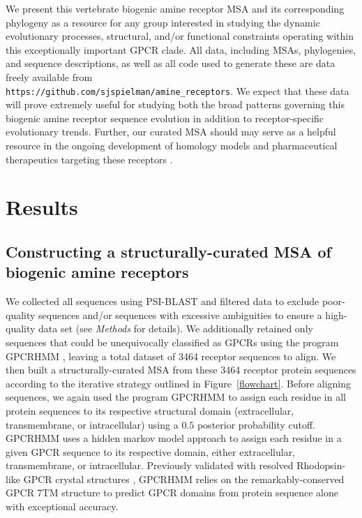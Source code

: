 \documentclass[fleqn,10pt]{wlpeerj}
\begin{document}
We present this vertebrate biogenic amine receptor MSA and its corresponding phylogeny as a resource for any group interested in studying the dynamic evolutionary processes, structural, and/or functional constraints operating within this exceptionally important GPCR clade. All data, including MSAs, phylogenies, and sequence descriptions, as well as all code used to generate these are data freely available from \\\texttt{https://github.com/sjspielman/amine\_receptors}. We expect that these data will prove extremely useful for studying both the broad patterns governing this biogenic amine receptor sequence evolution in addition to receptor-specific evolutionary trends. Further, our curated MSA should may serve as a helpful resource in the ongoing development of homology models and pharmaceutical therapeutics targeting these receptors \citep{Kristiansen2004,Ishiguro2004,Eversetal2005,Masonetal2012}.




\section*{Results}

\subsection*{Constructing a structurally-curated MSA of biogenic amine receptors}

We collected all sequences using PSI-BLAST and filtered data to exclude poor-quality sequences and/or sequences with excessive ambiguities to ensure a high-quality data set (see \emph{Methods} for details). We additionally retained only sequences that could be unequivocally classified as GPCRs using the program GPCRHMM \citep{Wistrand2006}, leaving a total dataset of 3464 receptor sequences to align. We then built a structurally-curated MSA from these 3464 receptor protein sequences according to the iterative strategy outlined in Figure~\ref{flowchart}. Before aligning sequences, we again used the program GPCRHMM \citep{Wistrand2006} to assign each residue in all protein sequences to its respective structural domain (extracellular, transmembrane, or intracellular) using a $0.5$ posterior probability cutoff. GPCRHMM uses a hidden markov model approach to assign each residue in a given GPCR sequence to its respective domain, either extracellular, transmembrane, or intracellular. Previously validated with resolved Rhodopsin-like GPCR crystal structures \citep{SpielmanWilke2013}, GPCRHMM relies on the remarkably-conserved GPCR 7TM structure to predict GPCR domains from protein sequence alone with exceptional accuracy. 
\end{document}
